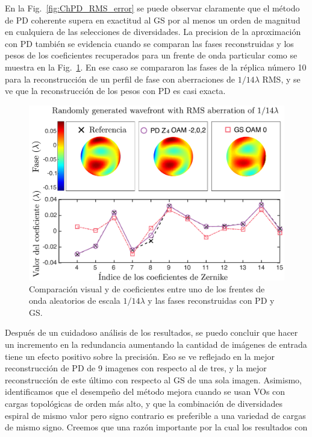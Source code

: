 En la Fig.~\ref{fig:ChPD_RMS_error} se puede observar claramente que
el método de PD coherente supera en 
exactitud al GS por al menos un orden de magnitud en cualquiera de las
selecciones de diversidades. La precision de la aproximación con PD
también se evidencia cuando se comparan las fases reconstruidas y los pesos
de los coeficientes recuperados para un frente de onda particular como
se muestra en la Fig.~\ref{fig:ChPD_visual_comparison}. En ese caso se
compararon las fases de la réplica número 10 para la reconstrucción de
un perfil de fase con aberraciones de $1/14\lambda$ RMS, y se ve
que la reconstrucción de los pesos con PD es casi exacta. 
\begin{figure}[h!]
\centering
\includegraphics[scale=.35]{phase_comparison_esp.pdf}
\caption[Resultados visuales de simulaciones de PD coherente para
aberración $1/14\lambda$]{Comparación visual y de coeficientes entre uno de los frentes
  de onda aleatorios de escala $1/14\lambda$ y las fases reconstruidas
  con PD y GS.} 
\label{fig:ChPD_visual_comparison}
\end{figure}
Después de un cuidadoso análisis de los resultados, se puedo concluir que hacer un
incremento en la redundancia aumentando la cantidad de imágenes de
entrada tiene un efecto positivo sobre la precisión. Eso se ve
reflejado en la mejor reconstrucción de PD de 9 imagenes con respecto
al de tres, y la mejor reconstrucción de este último con respecto al GS
de una sola imagen.  Asimismo, identificamos que el desempeño del
método mejora cuando se usan VOs con cargas topológicas de orden más
alto, y que la combinación de diversidades espiral de mismo valor pero
signo contrario es preferible a una variedad de cargas de mismo
signo. Creemos que una razón importante por la cual los resultados con

